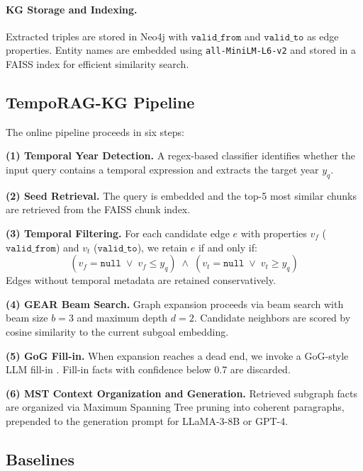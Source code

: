 \documentclass[11pt]{article}
\begin{document}
\paragraph{KG Storage and Indexing.}
Extracted triples are stored in Neo4j with $\mathtt{valid\_from}$ and
$\mathtt{valid\_to}$ as edge properties. Entity names are embedded using
\texttt{all-MiniLM-L6-v2} \cite{reimers2019sentencebert} and stored in a
FAISS index for efficient similarity search.

\subsection{TempoRAG-KG Pipeline}

The online pipeline proceeds in six steps:

\textbf{(1) Temporal Year Detection.}
A regex-based classifier identifies whether the input query contains a
temporal expression and extracts the target year $y_q$.

\textbf{(2) Seed Retrieval.}
The query is embedded and the top-5 most similar chunks are retrieved
from the FAISS chunk index.

\textbf{(3) Temporal Filtering.}
For each candidate edge $e$ with properties $v_f$ ($\mathtt{valid\_from}$)
and $v_t$ ($\mathtt{valid\_to}$), we retain $e$ if and only if:
\begin{equation}
  (v_f = \texttt{null} \;\lor\; v_f \leq y_q) \;\land\;
  (v_t = \texttt{null} \;\lor\; v_t \geq y_q)
  \label{eq:filter}
\end{equation}
Edges without temporal metadata are retained conservatively.

\textbf{(4) GEAR Beam Search.}
Graph expansion proceeds via beam search \cite{ma2025gear} with beam
size $b=3$ and maximum depth $d=2$. Candidate neighbors are scored by
cosine similarity to the current subgoal embedding.

\textbf{(5) GoG Fill-in.}
When expansion reaches a dead end, we invoke a GoG-style LLM fill-in
\cite{he2024gog}. Fill-in facts with confidence below 0.7 are discarded.

\textbf{(6) MST Context Organization and Generation.}
Retrieved subgraph facts are organized via Maximum Spanning Tree pruning
into coherent paragraphs, prepended to the generation prompt for
LLaMA-3-8B or GPT-4.

\subsection{Baselines}
\end{document}
